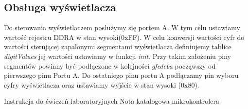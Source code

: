 \documentclass[12pt]{article}
\begin{document}
\subsection{Obsługa wyświetlacza}
Do sterowania wyświetlaczem posłużymy się portem A. W tym celu ustawiamy wartość rejestru DDRA w stan wysoki(0xFF). W celu konwersji wartości cyfr do wartości sterującej zapalonymi segmentami wyświetlacza definiujemy tablice \textit{digitValues} jej wartości ustawiamy w funkcji \textit{init}. Przy takim założeniu piny segmentów powinny być podłączone w kolejności \textit{gfedcba} począwszy od pierwszego pinu Portu A. Do ostatniego pinu portu A podłączamy pin wyboru cyfry wyświetlacza oraz ustawiamy wyjście w stan wysoki (0x80).\\



\begin{thebibliography}{99}
 Instrukcja do ćwiczeń laboratoryjnych
\bibitem{} Nota katalogowa mikrokontrolera
\end{thebibliography}
\end{document}
